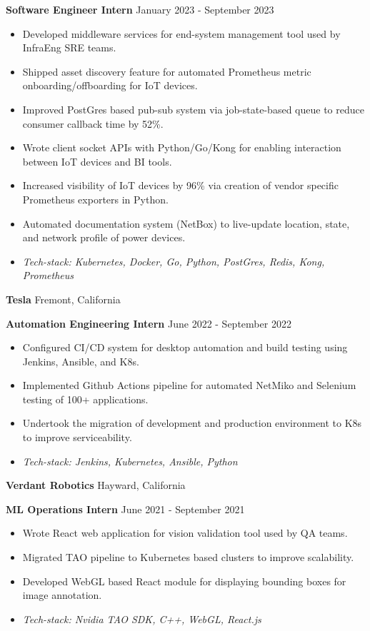 \documentclass[11pt]{article}
\begin{document}
\textbf{Software Engineer Intern} \hfill January 2023 - September 2023
\begin{itemize}[noitemsep, topsep=0pt, partopsep=0pt, parsep=0pt]
    \item Developed middleware services for end-system management tool used by InfraEng SRE teams.
    \item Shipped asset discovery feature for automated Prometheus metric onboarding/offboarding for IoT devices. 
    \item Improved PostGres based pub-sub system via job-state-based queue to reduce consumer callback time by 52\%.
    \item Wrote client socket APIs with Python/Go/Kong for enabling interaction between IoT devices and BI tools.
    \item Increased visibility of IoT devices by 96\% via creation of vendor specific Prometheus exporters in Python.
    \item Automated documentation system (NetBox) to live-update location, state, and network profile of power devices.
    \item \textit{Tech-stack: Kubernetes, Docker, Go, Python, PostGres, Redis, Kong, Prometheus}
\end{itemize}

\vspace{8pt}

\textbf{Tesla} \hfill Fremont, California

\textbf{Automation Engineering Intern} \hfill June 2022 - September 2022
\begin{itemize}[noitemsep, topsep=0pt, partopsep=0pt, parsep=0pt]
    \item Configured CI/CD system for desktop automation and build testing using Jenkins, Ansible, and K8s.
    \item Implemented Github Actions pipeline for automated NetMiko and Selenium testing of 100+ applications.
    \item Undertook the migration of development and production environment to K8s to improve serviceability.
    \item \textit{Tech-stack: Jenkins, Kubernetes, Ansible, Python}
\end{itemize}

\vspace{8pt}

\textbf{Verdant Robotics} \hfill Hayward, California

\textbf{ML Operations Intern} \hfill June 2021 - September 2021 
\begin{itemize}[noitemsep, topsep=0pt, partopsep=0pt, parsep=0pt]
    \item Wrote React web application for vision validation tool used by QA teams.
    \item Migrated TAO pipeline to Kubernetes based clusters to improve scalability.
    \item Developed WebGL based React module for displaying bounding boxes for image annotation.
    \item \textit{Tech-stack: Nvidia TAO SDK, C++, WebGL, React.js}
\end{itemize}
\end{document}
